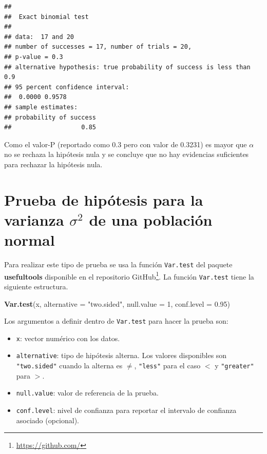 \documentclass[10pt,]{krantz}
\makeatletter
\newenvironment{Shaded}{\begin{snugshade}}{\end{snugshade}}
\newcommand{\KeywordTok}[1]{\textcolor[rgb]{0.13,0.29,0.53}{\textbf{#1}}}
\newcommand{\DataTypeTok}[1]{\textcolor[rgb]{0.13,0.29,0.53}{#1}}
\newcommand{\DecValTok}[1]{\textcolor[rgb]{0.00,0.00,0.81}{#1}}
\newcommand{\FloatTok}[1]{\textcolor[rgb]{0.00,0.00,0.81}{#1}}
\newcommand{\StringTok}[1]{\textcolor[rgb]{0.31,0.60,0.02}{#1}}
\newcommand{\NormalTok}[1]{#1}
\providecommand{\tightlist}{%
  \setlength{\itemsep}{0pt}\setlength{\parskip}{0pt}}
\renewcommand{\href}[2]{#2\footnote{\url{#1}}}
\newenvironment{kframe}{%
\medskip{}
\setlength{\fboxsep}{.8em}
 \def\at@end@of@kframe{}%
 \ifinner\ifhmode%
  \def\at@end@of@kframe{\end{minipage}}%
  \begin{minipage}{\columnwidth}%
 \fi\fi%
 \def\FrameCommand##1{\hskip\@totalleftmargin \hskip-\fboxsep
 \colorbox{shadecolor}{##1}\hskip-\fboxsep
     \hskip-\linewidth \hskip-\@totalleftmargin \hskip\columnwidth}%
 \MakeFramed {\advance\hsize-\width
   \@totalleftmargin\z@ \linewidth\hsize
   \@setminipage}}%
 {\par\unskip\endMakeFramed%
 \at@end@of@kframe}
\renewenvironment{Shaded}{\begin{kframe}}{\end{kframe}}
\makeatother
\begin{document}
\begin{verbatim}
## 
##  Exact binomial test
## 
## data:  17 and 20
## number of successes = 17, number of trials = 20,
## p-value = 0.3
## alternative hypothesis: true probability of success is less than 0.9
## 95 percent confidence interval:
##  0.0000 0.9578
## sample estimates:
## probability of success 
##                   0.85
\end{verbatim}

Como el valor-P (reportado como 0.3 pero con valor de 0.3231) es mayor
que \(\alpha\) no se rechaza la hipótesis nula y se concluye que no hay
evidencias suficientes para rechazar la hipótesis nula.

\section{\texorpdfstring{Prueba de hipótesis para la varianza
\(\sigma^2\) de una población
normal}{Prueba de hipótesis para la varianza \textbackslash{}sigma\^{}2 de una población normal}}\label{prueba-de-hipotesis-para-la-varianza-sigma2-de-una-poblacion-normal}

Para realizar este tipo de prueba se usa la función \texttt{Var.test}
del paquete \textbf{usefultools} \citep{R-usefultools} disponible en el
repositorio \href{https://github.com/}{GitHub}. La función
\texttt{Var.test} tiene la siguiente estructura.

\begin{Shaded}
\begin{Highlighting}[]
\KeywordTok{Var.test}\NormalTok{(x, }\DataTypeTok{alternative =} \StringTok{"two.sided"}\NormalTok{,}
         \DataTypeTok{null.value =} \DecValTok{1}\NormalTok{, }\DataTypeTok{conf.level =} \FloatTok{0.95}\NormalTok{)}
\end{Highlighting}
\end{Shaded}

Los argumentos a definir dentro de \texttt{Var.test} para hacer la
prueba son:

\begin{itemize}
\tightlist
\item
  \texttt{x}: vector numérico con los datos.
\item
  \texttt{alternative}: tipo de hipótesis alterna. Los valores
  disponibles son \texttt{"two.sided"} cuando la alterna es \(\neq\),
  \texttt{"less"} para el caso \(<\) y \texttt{"greater"} para \(>\).
\item
  \texttt{null.value}: valor de referencia de la prueba.
\item
  \texttt{conf.level}: nivel de confianza para reportar el intervalo de
  confianza asociado (opcional).
\end{itemize}
\end{document}
